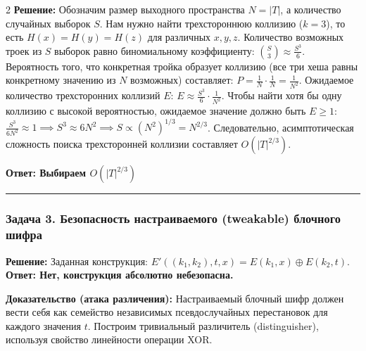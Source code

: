 ﻿\documentclass[10pt,a4paper,landscape]{extarticle}
\begin{document}
\begin{multicols*}{2}
\textbf{Решение:} Обозначим размер выходного пространства \(N = |T|\), а количество случайных выборок \(S\). Нам нужно найти трехстороннюю коллизию (\(k=3\)), то есть \(H(x) = H(y) = H(z)\) для различных \(x, y, z\). Количество возможных троек из \(S\) выборок равно биномиальному коэффициенту: \(\binom{S}{3} \approx \frac{S^3}{6}\). Вероятность того, что конкретная тройка образует коллизию (все три хеша равны конкретному значению из \(N\) возможных) составляет: \(P = \frac{1}{N} \cdot \frac{1}{N} = \frac{1}{N^2}\). Ожидаемое количество трехсторонних коллизий \(E\): \(E \approx \frac{S^3}{6} \cdot \frac{1}{N^2}\). Чтобы найти хотя бы одну коллизию с высокой вероятностью, ожидаемое значение должно быть \(E \ge 1\): \(\frac{S^3}{6N^2} \approx 1 \implies S^3 \approx 6N^2 \implies S \propto (N^2)^{1/3} = N^{2/3}\). Следовательно, асимптотическая сложность поиска трехсторонней коллизии составляет \(O(|T|^{2/3})\).

\textbf{Ответ: Выбираем \(O(|T|^{2/3})\)}

\begin{center}\rule{0.5\linewidth}{0.5pt}\end{center}

\subsubsection{Задача 3. Безопасность настраиваемого (tweakable) блочного шифра}\label{ux437ux430ux434ux430ux447ux430-3.-ux431ux435ux437ux43eux43fux430ux441ux43dux43eux441ux442ux44c-ux43dux430ux441ux442ux440ux430ux438ux432ux430ux435ux43cux43eux433ux43e-tweakable-ux431ux43bux43eux447ux43dux43eux433ux43e-ux448ux438ux444ux440ux430}

\textbf{Решение:} Заданная конструкция: \(E'((k_1,k_2), t, x) = E(k_1, x) \oplus E(k_2, t)\). \textbf{Ответ: Нет, конструкция абсолютно небезопасна.}

\textbf{Доказательство (атака различения):} Настраиваемый блочный шифр должен вести себя как семейство независимых псевдослучайных перестановок для каждого значения \(t\). Построим тривиальный различитель (distinguisher), используя свойство линейности операции XOR.


\end{multicols*}
\end{document}
